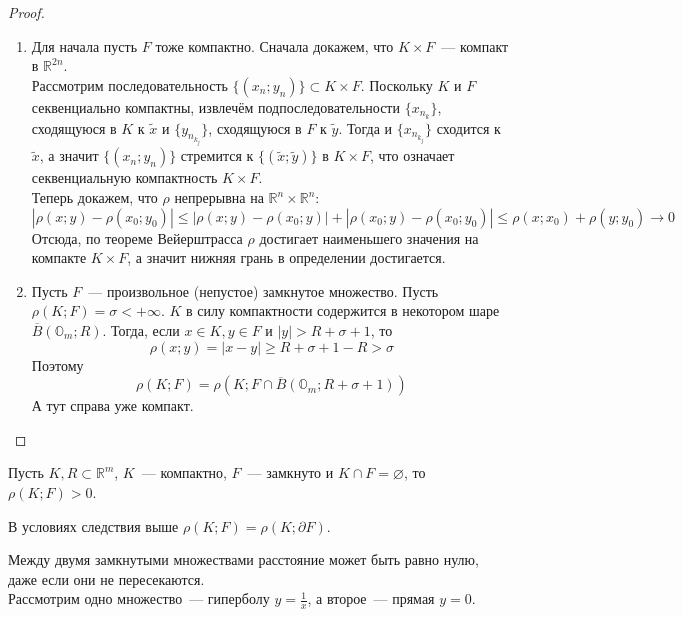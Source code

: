 \documentclass{article}
\begin{document}
    \begin{proof}
        \begin{enumerate}
            \item Для начала пусть $F$ тоже компактно. Сначала докажем, что $K\times F$~--- компакт в $\mathbb R^{2n}$.\\
            Рассмотрим последовательность $\{(x_n;y_n)\}\subset K\times F$. Поскольку $K$ и $F$ секвенциально компактны, извлечём подпоследовательности $\{x_{n_k}\}$, сходящуюся в $K$ к $\tilde x$ и $\{y_{n_{k_j}}\}$, сходящуюся в $F$ к $\tilde y$. Тогда и $\{x_{n_{k_j}}\}$ сходится к $\tilde x$, а значит $\{(x_n;y_n)\}$ стремится к $\{(\tilde x;\tilde y)\}$ в $K\times F$, что означает секвенциальную компактность $K\times F$.\\
            Теперь докажем, что $\rho$ непрерывна на $\mathbb R^n\times\mathbb R^n$:
            $$
            |\rho(x;y)-\rho(x_0;y_0)|\leqslant|\rho(x;y)-\rho(x_0;y)|+|\rho(x_0;y)-\rho(x_0;y_0)|\leqslant\rho(x;x_0)+\rho(y;y_0) \to0
            $$
            Отсюда, по теореме Вейерштрасса $\rho$ достигает наименьшего значения на компакте $K\times F$, а значит нижняя грань в определении достигается.
            \item Пусть $F$~--- произвольное (непустое) замкнутое множество. Пусть $\rho(K;F)=\sigma<+\infty$. $K$ в силу компактности содержится в некотором шаре $\overline B(\mathbb O_m;R)$. Тогда, если $x\in K,y\in F$ и $|y|>R+\sigma+1$, то
            $$
            \rho(x;y)=|x-y|\geqslant R+\sigma+1-R>\sigma
            $$
            Поэтому
            $$
            \rho(K;F)=\rho(K;F\cap\overline B(\mathbb O_m;R+\sigma+1))
            $$
            А тут справа уже компакт.
        \end{enumerate}
    \end{proof}
    \begin{corollary}
        Пусть $K,R\subset\mathbb R^m$, $K$~--- компактно, $F$~--- замкнуто и $K\cap F=\varnothing$, то $\rho(K;F)>0$.
    \end{corollary}
    \begin{corollary}
        В условиях следствия выше $\rho(K;F)=\rho(K;\partial F)$.
    \end{corollary}
    \begin{example}
        Между двумя замкнутыми множествами расстояние может быть равно нулю, даже если они не пересекаются.\\
        Рассмотрим одно множество~--- гиперболу $y=\frac1x$, а второе~--- прямая $y=0$.
    \end{example}
\end{document}
